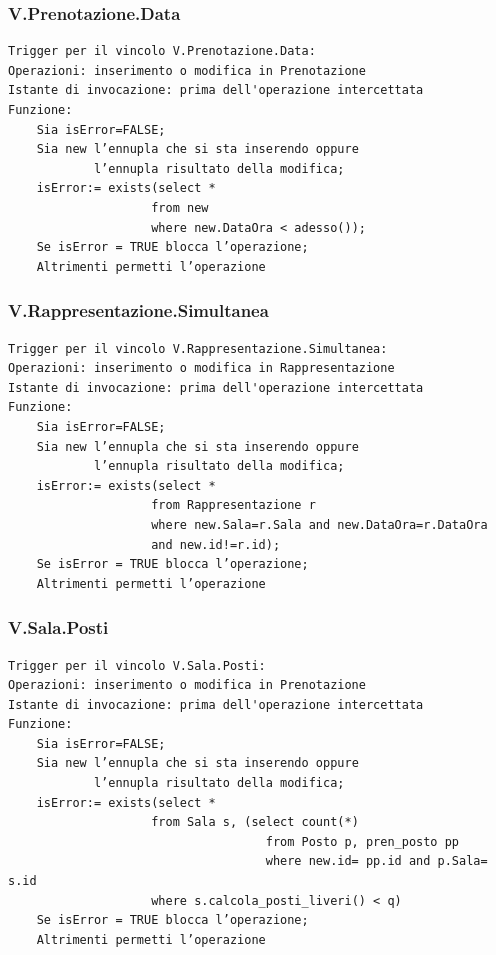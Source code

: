\documentclass[12pt, letterpaper]{article}
\begin{document}
\subsubsection{V.Prenotazione.Data}
\begin{verbatim}
Trigger per il vincolo V.Prenotazione.Data:
Operazioni: inserimento o modifica in Prenotazione
Istante di invocazione: prima dell'operazione intercettata
Funzione:
    Sia isError=FALSE;
    Sia new l’ennupla che si sta inserendo oppure 
            l’ennupla risultato della modifica;
    isError:= exists(select *
                    from new
                    where new.DataOra < adesso());
    Se isError = TRUE blocca l’operazione;
    Altrimenti permetti l’operazione
\end{verbatim}
\subsubsection{V.Rappresentazione.Simultanea}
\begin{verbatim}
Trigger per il vincolo V.Rappresentazione.Simultanea:
Operazioni: inserimento o modifica in Rappresentazione
Istante di invocazione: prima dell'operazione intercettata
Funzione:
    Sia isError=FALSE;
    Sia new l’ennupla che si sta inserendo oppure 
            l’ennupla risultato della modifica;
    isError:= exists(select * 
                    from Rappresentazione r
                    where new.Sala=r.Sala and new.DataOra=r.DataOra 
                    and new.id!=r.id);
    Se isError = TRUE blocca l’operazione;
    Altrimenti permetti l’operazione
\end{verbatim}\newpage
\subsubsection{V.Sala.Posti}
\begin{verbatim}
Trigger per il vincolo V.Sala.Posti:
Operazioni: inserimento o modifica in Prenotazione
Istante di invocazione: prima dell'operazione intercettata
Funzione:
    Sia isError=FALSE;
    Sia new l’ennupla che si sta inserendo oppure 
            l’ennupla risultato della modifica;
    isError:= exists(select * 
                    from Sala s, (select count(*)
                                    from Posto p, pren_posto pp
                                    where new.id= pp.id and p.Sala= s.id
                    where s.calcola_posti_liveri() < q) 
    Se isError = TRUE blocca l’operazione;
    Altrimenti permetti l’operazione
\end{verbatim}
\end{document}
